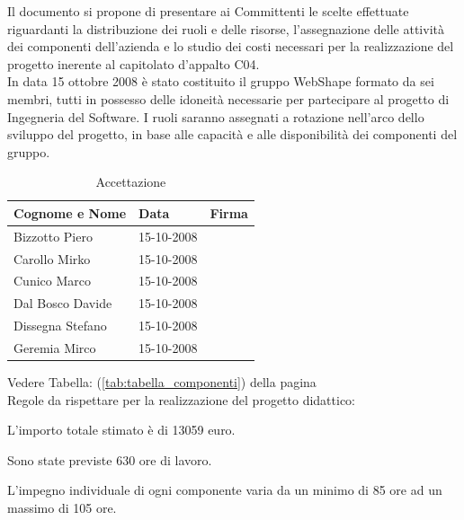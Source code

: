 \newpage
\thispagestyle{fancy}
\tableofcontents
\thispagestyle{fancy}
\newpage


Il documento si propone di presentare ai Committenti le scelte effettuate riguardanti la distribuzione dei ruoli e delle risorse, l'assegnazione delle attivit\`a dei componenti dell'azienda e lo studio dei costi necessari per la realizzazione del progetto inerente al capitolato d'appalto C04.\\

In data 15 ottobre 2008 \`e stato costituito il gruppo WebShape formato da sei membri, tutti in possesso delle idoneit\`a necessarie per partecipare al progetto di Ingegneria del Software.
I ruoli saranno assegnati a rotazione nell'arco dello sviluppo del progetto, in base alle capacit\`a e alle disponibilit\`a dei componenti del gruppo.\\

\begin{table}[h]
	\begin{center}
		  \begin{tabular}{|p{}|l|p{}|}
		 \hline 
		 \textbf{Cognome e Nome} & \textbf{Data} & \textbf{Firma}\\
		 \hline
		Bizzotto Piero & 15-10-2008 & \\
		\hline
		Carollo Mirko & 15-10-2008 & \\
		\hline
		Cunico Marco & 15-10-2008 & \\
		\hline
		Dal Bosco Davide & 15-10-2008 & \\
		\hline
		Dissegna Stefano & 15-10-2008 & \\
		\hline
		Geremia Mirco & 15-10-2008 & \\
		\hline
		\end{tabular}
	\caption{Accettazione} 
	\label{tabella_accettazione}
	\end{center}	
\end{table}



Vedere Tabella: (\ref{tab:tabella_componenti}) della pagina ~\pageref{tab:tabella_componenti}\\

Regole da rispettare per la realizzazione del progetto didattico:
\begin{elenconumerato}{\normindent}
				\item L'importo totale stimato \`e di 13059 euro.\\
				\item Sono state previste 630 ore di lavoro.\\
				\item L'impegno individuale di ogni componente varia da un minimo di 85 ore ad un massimo di 105 ore.\\
			\end{elenconumerato}

